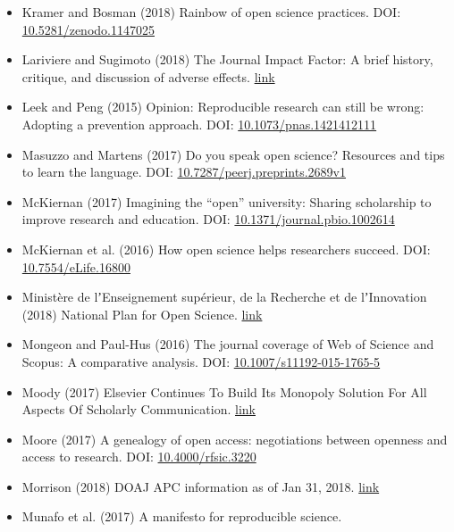\begin{itemize}
\item
  Kramer and Bosman (2018) Rainbow of open science practices. DOI:
  \href{https://doi.org/10.5281/zenodo.1147025}{10.5281/zenodo.1147025}
\item
  Lariviere and Sugimoto (2018) The Journal Impact Factor: A brief
  history, critique, and discussion of adverse effects.
  \href{https://arxiv.org/abs/1801.08992}{link}
\item
  Leek and Peng (2015) Opinion: Reproducible research can still be
  wrong: Adopting a prevention approach. DOI:
  \href{https://doi.org/10.1073/pnas.1421412111}{10.1073/pnas.1421412111}
\item
  Masuzzo and Martens (2017) Do you speak open science? Resources and
  tips to learn the language. DOI:
  \href{https://doi.org/10.7287/peerj.preprints.2689v1}{10.7287/peerj.preprints.2689v1}
\item
  McKiernan (2017) Imagining the ``open'' university: Sharing
  scholarship to improve research and education. DOI:
  \href{https://doi.org/10.1371/journal.pbio.1002614}{10.1371/journal.pbio.1002614}
\item
  McKiernan et al. (2016) How open science helps researchers succeed.
  DOI: \href{https://doi.org/10.7554/eLife.16800}{10.7554/eLife.16800}
\item
  Ministère de lʼEnseignement supérieur, de la Recherche et de
  lʼInnovation (2018) National Plan for Open Science.
  \href{https://libereurope.eu/wp-content/uploads/2018/07/SO_A4_2018_05-EN_print.pdf}{link}
\item
  Mongeon and Paul-Hus (2016) The journal coverage of Web of Science and
  Scopus: A comparative analysis. DOI:
  \href{https://doi.org/10.1007/s11192-015-1765-5}{10.1007/s11192-015-1765-5}
\item
  Moody (2017) Elsevier Continues To Build Its Monopoly Solution For All
  Aspects Of Scholarly Communication.
  \href{https://www.techdirt.com/articles/20170804/05454537924/elsevier-continues-to-build-monopoly-solution-all-aspects-scholarly-communication.shtml}{link}
\item
  Moore (2017) A genealogy of open access: negotiations between openness
  and access to research. DOI:
  \href{https://doi.org/10.4000/rfsic.3220}{10.4000/rfsic.3220}
\item
  Morrison (2018) DOAJ APC information as of Jan 31, 2018.
  \href{https://sustainingknowledgecommons.org/2018/02/06/doaj-apc-information-as-of-jan-31-2018/}{link}
\item
  Munafo et al. (2017) A manifesto for reproducible science.

\end{itemize}

